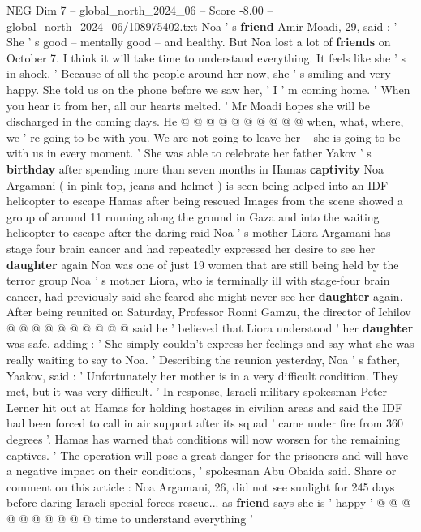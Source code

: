 \begin{textsample}{NEG Dim 7 – global\_north\_2024\_06 – Score -8.00 – global\_north\_2024\_06/108975402.txt}
Noa ' s \textbf{friend} Amir Moadi, 29, said : ' She ' s good -- mentally good -- and healthy.
But Noa lost a lot of \textbf{friends} on October 7.
I think it will take time to understand everything.
It feels like she ' s in shock. ' Because of all the people around her now, she ' s smiling and very happy.
She told us on the phone before we saw her, ' I ' m coming home. ' When you hear it from her, all our hearts melted. ' Mr Moadi hopes she will be discharged in the coming days.
He @ @ @ @ @ @ @ @ @ @ when, what, where, we ' re going to be with you.
We are not going to leave her -- she is going to be with us in every moment. ' She was able to celebrate her father Yakov ' s \textbf{birthday} after spending more than seven months in Hamas \textbf{captivity} Noa Argamani ( in pink top, jeans and helmet ) is seen being helped into an IDF helicopter to escape Hamas after being rescued Images from the scene showed a group of around 11 running along the ground in Gaza and into the waiting helicopter to escape after the daring raid Noa ' s mother Liora Argamani has stage four brain cancer and had repeatedly expressed her desire to see her \textbf{daughter} again Noa was one of just 19 women that are still being held by the terror group Noa ' s mother Liora, who is terminally ill with stage-four brain cancer, had previously said she feared she might never see her \textbf{daughter} again.
After being reunited on Saturday, Professor Ronni Gamzu, the director of Ichilov @ @ @ @ @ @ @ @ @ @ said he ' believed that Liora understood ' her \textbf{daughter} was safe, adding : ' She simply couldn't express her feelings and say what she was really waiting to say to Noa. ' Describing the reunion yesterday, Noa ' s father, Yaakov, said : ' Unfortunately her mother is in a very difficult condition.
They met, but it was very difficult. ' In response, Israeli military spokesman Peter Lerner hit out at Hamas for holding hostages in civilian areas and said the IDF had been forced to call in air support after its squad ' came under fire from 360 degrees '.
Hamas has warned that conditions will now worsen for the remaining captives. ' The operation will pose a great danger for the prisoners and will have a negative impact on their conditions, ' spokesman Abu Obaida said.
Share or comment on this article : Noa Argamani, 26, did not see sunlight for 245 days before daring Israeli special forces rescue... as \textbf{friend} says she is ' happy ' @ @ @ @ @ @ @ @ @ @ time to understand everything '

\end{textsample}
